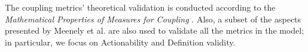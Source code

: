 The coupling metrics' theoretical validation is conducted according to the \textit{Mathematical Properties of Measures for Coupling} \cite{srinivasan2014software}. Also, a subset of the aspects presented by Meenely et al. \cite{Meneely2012} are also used to validate all the metrics in the model; in particular, we focus on Actionability and Definition validity.
